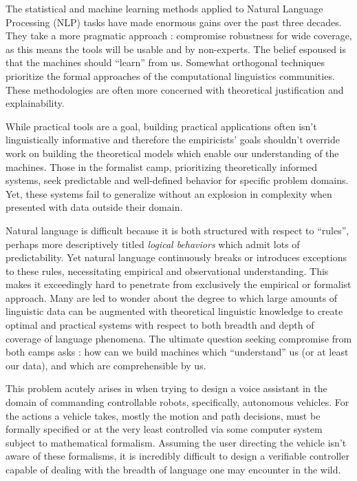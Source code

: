 \documentclass[a4paper, 11pt]{article}
\begin{document}
The statistical and machine learning methods applied to Natural Language
Processing (NLP) tasks have made enormous gains over the past three decades.
They take a more pragmatic approach : compromise robustness for wide coverage,
as this means the tools will be usable and by non-experts. The belief espoused
is that the machines should ``learn'' from us. Somewhat orthogonal techniques
prioritize the formal approaches of the computational linguistics communities.
These methodologies are often more concerned with theoretical justification and
explainability.

While practical tools are a goal, building practical applications often isn't
linguistically informative and therefore the empiricists' goals shouldn't
override work on building the theoretical models which enable our understanding
of the machines. Those in the formalist camp, prioritizing theoretically
informed systems, seek predictable and well-defined behavior for specific
problem domains. Yet, these systems fail to generalize without an explosion in
complexity when presented with data outside their domain.

Natural language is difficult because it is both structured with respect to
``rules'', perhaps more descriptively titled \emph{logical behaviors} which
admit lots of predictability. Yet natural language continuously breaks or
introduces exceptions to these rules, necessitating empirical and observational
understanding. This makes it exceedingly hard to penetrate from exclusively the
empirical or formalist approach. Many are led to wonder about the degree to
which large amounts of linguistic data can be augmented with theoretical
linguistic knowledge to create optimal and practical systems with respect to
both breadth and depth of coverage of language phenomena. The ultimate question
seeking compromise from both camps asks : how can we build machines which
``understand'' us (or at least our data), and which are comprehensible by us.

This problem acutely arises in when trying to design a voice assistant in the
domain of commanding controllable robots, specifically, autonomous vehicles. For
the actions a vehicle takes, mostly the motion and path decisions, must be
formally specified or at the very least controlled via some computer system
subject to mathematical formalism. Assuming the user directing the vehicle isn't
aware of these formalisms, it is incredibly difficult to design a verifiable
controller capable of dealing with the breadth of language one may encounter in
the wild.
\end{document}
